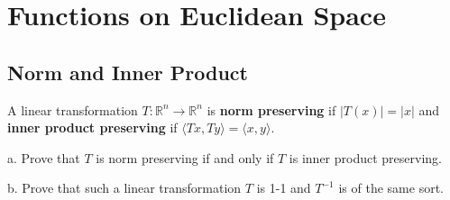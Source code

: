 \chapter{Functions on Euclidean Space}

\section{Norm and Inner Product}

\begin{exercise}{7}
    A linear transformation $T: \mathbb{R}^n \rightarrow \mathbb{R}^n$ is \textbf{norm preserving} if $\lvert T(x) \rvert = \lvert x \rvert$ and \textbf{inner product preserving} if $\langle Tx, Ty \rangle = \langle x, y \rangle$.

    a. Prove that $T$ is norm preserving if and only if $T$ is inner product preserving.

    b. Prove that such a linear transformation $T$ is 1-1 and $T^{-1}$ is of the same sort.
\end{exercise}

